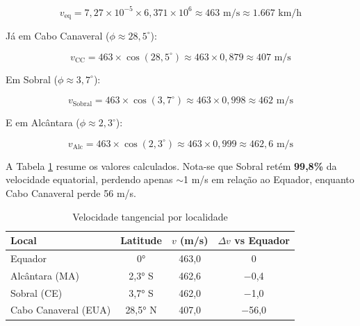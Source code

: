 \begin{equation}
\label{eq:vel-equador}
v_{\text{eq}} = 7{,}27 \times 10^{-5} \times 6{,}371 \times 10^{6} \approx 463 \text{ m/s} \approx 1.667 \text{ km/h}
\end{equation}

\noindent Já em Cabo Canaveral ($\phi \approx 28{,}5^{\circ}$):

\begin{equation}
\label{eq:vel-canaveral}
v_{\text{CC}} = 463 \times \cos(28{,}5^{\circ}) \approx 463 \times 0{,}879 \approx 407 \text{ m/s}
\end{equation}

\noindent Em Sobral ($\phi \approx 3{,}7^{\circ}$):

\begin{equation}
\label{eq:vel-sobral}
v_{\text{Sobral}} = 463 \times \cos(3{,}7^{\circ}) \approx 463 \times 0{,}998 \approx 462 \text{ m/s}
\end{equation}

\noindent E em Alcântara ($\phi \approx 2{,}3^{\circ}$):

\begin{equation}
\label{eq:vel-alcantara}
v_{\text{Alc}} = 463 \times \cos(2{,}3^{\circ}) \approx 463 \times 0{,}999 \approx 462{,}6 \text{ m/s}
\end{equation}

A Tabela \ref{tab:velocidade-tangencial} resume os valores calculados. Nota-se que Sobral retém \textbf{99,8\%} da velocidade equatorial, perdendo apenas $\sim$1 m/s em relação ao Equador, enquanto Cabo Canaveral perde 56 m/s.

\begin{table}[htb]
    \centering
    \caption{Velocidade tangencial por localidade}
    \label{tab:velocidade-tangencial}
    \begin{tabular}{lccc}
        \toprule
        \textbf{Local} & \textbf{Latitude} & \textbf{$v$ (m/s)} & \textbf{$\Delta v$ vs Equador} \\
        \midrule
        Equador & 0° & 463,0 & 0 \\
        Alcântara (MA) & 2,3° S & 462,6 & $-$0,4 \\
        Sobral (CE) & 3,7° S & 462,0 & $-$1,0 \\
        Cabo Canaveral (EUA) & 28,5° N & 407,0 & $-$56,0 \\
        \bottomrule
    \end{tabular}
\end{table}

